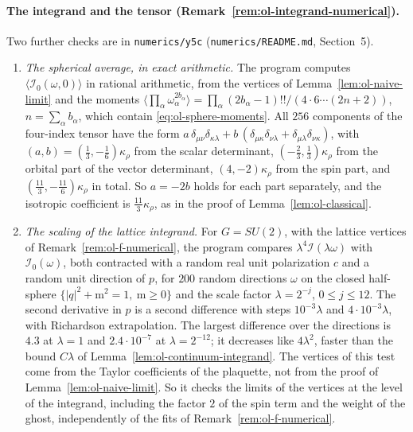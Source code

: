 \paragraph{The integrand and the tensor (Remark~\ref{rem:ol-integrand-numerical}).}
Two further checks are in \texttt{numerics/y5c} (\texttt{numerics/README.md}, Section~5).
\begin{enumerate}[label=(\roman*)]
\item \emph{The spherical average, in exact arithmetic.} The program computes $\langle\mathcal I_0(\omega,0)\rangle$ in rational arithmetic, from the vertices of Lemma~\ref{lem:ol-naive-limit} and the moments $\langle\prod_\alpha\omega_\alpha^{2b_\alpha}\rangle=\prod_\alpha(2b_\alpha-1)!!/(4\cdot6\cdots(2n+2))$, $n=\sum_\alpha b_\alpha$, which contain \eqref{eq:ol-sphere-moments}. All $256$ components of the four-index tensor have the form $a\,\delta_{\mu\nu}\delta_{\kappa\lambda}+b\,(\delta_{\mu\kappa}\delta_{\nu\lambda}+\delta_{\mu\lambda}\delta_{\nu\kappa})$, with $(a,b)=(\frac13,-\frac16)\kappa_\rho$ from the scalar determinant, $(-\frac23,\frac13)\kappa_\rho$ from the orbital part of the vector determinant, $(4,-2)\kappa_\rho$ from the spin part, and $(\frac{11}3,-\frac{11}6)\kappa_\rho$ in total. So $a=-2b$ holds for each part separately, and the isotropic coefficient is $\frac{11}3\kappa_\rho$, as in the proof of Lemma~\ref{lem:ol-classical}.
\item \emph{The scaling of the lattice integrand.} For $G=SU(2)$, with the lattice vertices of Remark~\ref{rem:ol-f-numerical}, the program compares $\lambda^4\mathcal I(\lambda\omega)$ with $\mathcal I_0(\omega)$, both contracted with a random real unit polarization $c$ and a random unit direction of $p$, for $200$ random directions $\omega$ on the closed half-sphere $\{|q|^2+\mathrm m^2=1,\ \mathrm m\ge0\}$ and the scale factor $\lambda=2^{-j}$, $0\le j\le12$. The second derivative in $p$ is a second difference with steps $10^{-3}\lambda$ and $4\cdot10^{-3}\lambda$, with Richardson extrapolation. The largest difference over the directions is $4.3$ at $\lambda=1$ and $2.4\cdot10^{-7}$ at $\lambda=2^{-12}$; it decreases like $4\lambda^2$, faster than the bound $C\lambda$ of Lemma~\ref{lem:ol-continuum-integrand}. The vertices of this test come from the Taylor coefficients of the plaquette, not from the proof of Lemma~\ref{lem:ol-naive-limit}. So it checks the limits of the vertices at the level of the integrand, including the factor $2$ of the spin term and the weight of the ghost, independently of the fits of Remark~\ref{rem:ol-f-numerical}.
\end{enumerate}

